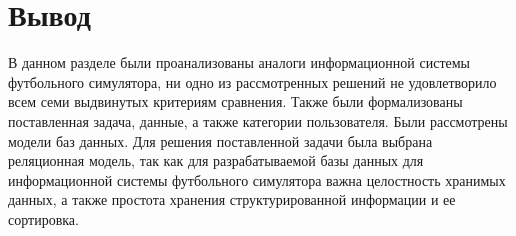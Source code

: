 \section{Вывод}

В данном разделе были проанализованы аналоги информационной системы футбольного симулятора, ни одно из рассмотренных решений не удовлетворило всем семи выдвинутых критериям сравнения. Также были формализованы поставленная задача, данные, а также категории пользователя. Были рассмотрены модели баз данных. Для решения поставленной задачи была выбрана реляционная модель, так как для разрабатываемой базы данных для информационной системы футбольного симулятора важна целостность хранимых данных, а также простота хранения структурированной информации и ее сортировка.
